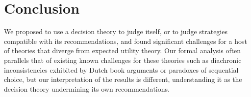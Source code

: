 \documentclass[a4paper]{article}
\newcommand\U{\mathfrak{U}} %
\newcommand{\todoinfo}[2][]{\todo[backgroundcolor=orange!80,bordercolor=black,linecolor=gray!80, #1,inline,caption={}]{#2}}
\renewcommand{\color}[1]{}
\newenvironment{colored}[1]{\leavevmode\color{#1}}{}
\newcommand\SetDelimiter[1][]{
	\nonscript\,#1\vert \allowbreak \nonscript\,\mathopen{}}
\providecommand\given{\SetDelimiter}
\newenvironment{CCM rewritten}
{\begingroup\color{blue}} %
{\endgroup}              %
\begin{document}
%
%
%
%
%



\section{Conclusion}

{\color{violet}
We proposed to use a decision theory to judge itself, or to judge strategies compatible with its recommendations, and found significant challenges for a host of theories that diverge from expected utility theory. 
Our formal analysis often parallels that of existing known challenges for these theories such as diachronic inconsistencies exhibited by Dutch book arguments or paradoxes of sequential choice, but our interpretation of the results is different, understanding it as the decision theory undermining its own recommendations. }
\end{document}
